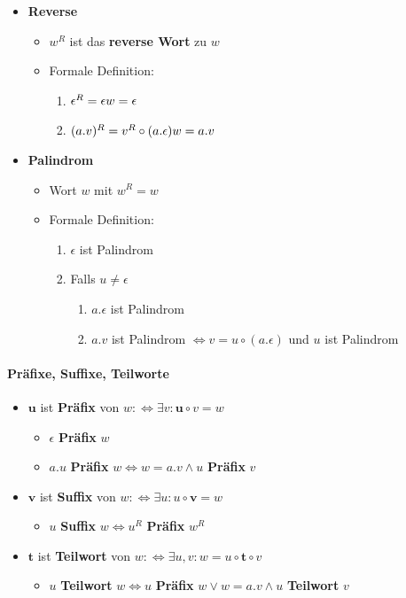 \documentclass{scrartcl}
\begin{document}
\begin{itemize}
	\item \textbf{Reverse}
	\begin{itemize}
		\item $w^R$ ist das \textbf{reverse Wort} zu $w$
		\item Formale Definition:
		\begin{enumerate}
			\item $\epsilon^R = \epsilon \hfill w = \epsilon$
			\item $(a.v)^R = v^R \circ (a.\epsilon) \hfill w = a.v$
		\end{enumerate}
	\end{itemize}
	\item \textbf{Palindrom}
	\begin{itemize}
		\item Wort $w$ mit $w^R = w$
		\item Formale Definition:
		\begin{enumerate}
			\item $\epsilon$ ist Palindrom
			\item Falls $u \neq \epsilon$
			\begin{enumerate}
				\item $a.\epsilon$ ist Palindrom
				\item $a.v$ ist Palindrom $\iff v = u \circ (a.\epsilon)$ und $u$ ist Palindrom
			\end{enumerate}
		\end{enumerate}
	\end{itemize}
\end{itemize}

\paragraph{Präfixe, Suffixe, Teilworte}

\begin{itemize}
	\item $\mathbf{u}$ ist \textbf{Präfix} von $w :\iff \exists v: \mathbf{u} \circ v = w$
	\begin{itemize}
		\item $\epsilon$ \textbf{Präfix} $w$
		\item $a.u$ \textbf{Präfix} $w \iff w= a.v \wedge u$ \textbf{Präfix} $v$
	\end{itemize}
	\item $\mathbf{v}$ ist \textbf{Suffix} von $w :\iff \exists u: u \circ \mathbf{v} = w$
	\begin{itemize}
		\item $u$ \textbf{Suffix} $w \iff u^R$ \textbf{Präfix} $w^R$
	\end{itemize}
	\item $\mathbf{t}$ ist \textbf{Teilwort} von $w :\iff \exists u,v: w = u \circ \mathbf{t} \circ v$
	\begin{itemize}
		\item $u$ \textbf{Teilwort} $w \iff u$ \textbf{Präfix} $w \vee w = a.v \wedge u$ \textbf{Teilwort} $v$
	\end{itemize}
\end{itemize}
\end{document}
